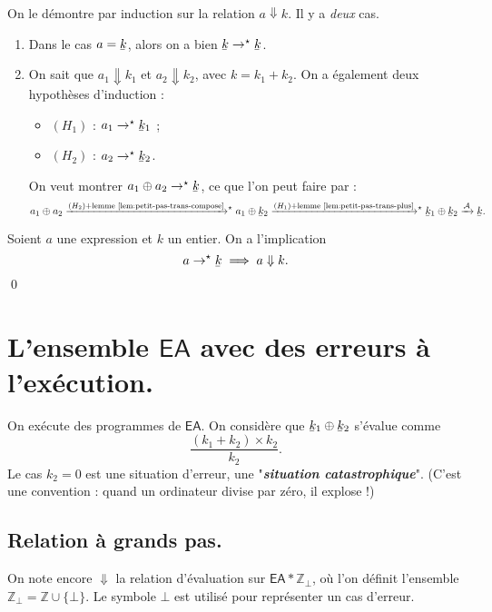 \documentclass[../main]{subfiles}
\begin{document}
  \begin{prv}
    On le démontre par induction sur la relation $a\Downarrow k$.
    Il y a \textit{deux} cas.
    \begin{enumerate}
      \item Dans le cas $a = \ubar k$, alors on a bien $\ubar k \to^\star \ubar k$.
      \item On sait que $a_1 \Downarrow k_1$ et $a_2 \Downarrow k_2$, avec $k = k_1 + k_2$.
        On a également deux hypothèses d'induction : 
        \begin{itemize}
          \item $(H_1)$ : $a_1 \to^\star \ubar{k}_1$ ;
          \item $(H_2)$ : $a_2 \to^\star \ubar{k}_2$.
        \end{itemize}
        On veut montrer $a_1 \oplus a_2 \to^\star \ubar{k}$, ce que l'on peut faire par :
        \[
          a_1 \oplus a_2
          \xrightarrow{\smash{(H_2) + \text{lemme~\ref{lem:petit-pas-trans-compose}}}}^\star
          a_1 \oplus \ubar{k}_2
          \xrightarrow{\smash{(H_1) + \text{lemme~\ref{lem:petit-pas-trans-plus}}}}^\star
          \ubar{k}_1 \oplus \ubar{k}_2
          \xrightarrow{\mathcal{A}} \ubar k
        .\] 
    \end{enumerate}
  \end{prv}

  \begin{prop}
    Soient $a$ une expression et $k$ un entier.
    On a l'implication \[
    a \to^\star \ubar k \implies a \Downarrow k
    .\]
    \qed
  \end{prop}

  \section{L'ensemble $\mathsf{EA}$ avec des erreurs à l'exécution.}

  On exécute des programmes de $\mathsf{EA}$.
  On considère que $\ubar{k}_1 \oplus \ubar{k}_2$ s'évalue comme \[
    \frac{(k_1+k_2) \times k_2}{k_2}
  .\]
  Le cas $k_2 = 0$ est une situation d'erreur, une "\textit{\textbf{situation catastrophique}}".
  (C'est une convention : quand un ordinateur divise par zéro, il explose !)

  \subsection{Relation à grands pas.}

  On note encore $\Downarrow$ la relation d'évaluation sur $\mathsf{EA} * \mathds{Z}_\bot$, où l'on définit l'ensemble $\mathds{Z}_\bot  = \mathds{Z} \cup \{\bot\}$.
  Le symbole $\bot$ est utilisé pour représenter un cas d'erreur.
\end{document}

